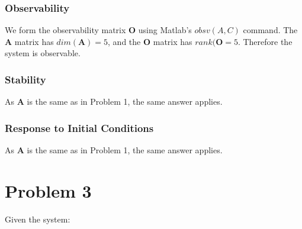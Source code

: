 \documentclass[]{article}
\begin{document}
\subsubsection{Observability}
We form the observability matrix $\mathbf{O}$ using Matlab's $obsv(A, C)$ command.
The $\mathbf{A}$ matrix has $dim(\mathbf{A})=5$, and the $\mathbf{O}$ matrix has $rank(\mathbf{O}=5$.
Therefore the system is observable.

\subsubsection{Stability}
As $\mathbf{A}$ is the same as in Problem 1, the same answer applies.

\subsubsection{Response to Initial Conditions}
As $\mathbf{A}$ is the same as in Problem 1, the same answer applies.

\section{Problem 3}

Given the system:
\end{document}
